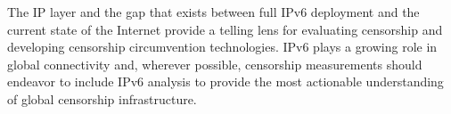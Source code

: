 The IP layer and the gap that exists between full IPv6 deployment and the
current state of the Internet provide a telling lens for evaluating censorship
and developing censorship circumvention technologies.
IPv6 plays a growing role in global connectivity and, wherever possible,
censorship measurements should endeavor to include IPv6 analysis to provide the
most actionable understanding of global censorship infrastructure.
